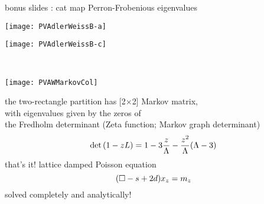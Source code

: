 \begin{frame}{bonus slides : cat map Perron-Frobenious eigenvalues}
\begin{center}
            \begin{minipage}[c]{0.23\textwidth}\begin{center}
\texttt{[image: PVAdlerWeissB-a]}
            \end{center}\end{minipage}
            \begin{minipage}[c]{0.23\textwidth}\begin{center}
\texttt{[image: PVAdlerWeissB-c]}
            \end{center}\end{minipage}
            ~~~
            \begin{minipage}[c]{0.09\textwidth}\begin{center}
\texttt{[image: PVAWMarkovCol]}
            \end{center}\end{minipage}
\end{center}
the two-rectangle partition has [2$\times$2] Markov
matrix, \\ with eigenvalues given by the
zeros of \\ the Fredholm determinant
(Zeta function; Markov graph determinant)
\[
\det(1-zL) =
 1-3\frac{z}{\ExpaEig}
     -\frac{z^2}{\ExpaEig}(\ExpaEig-3)
\nnu %
\]
\vfill that's it! lattice damped Poisson equation
\[
 (\Box -s+2d)x_{z} = m_z
\] %
\hfill solved completely and analytically!
\end{frame}

